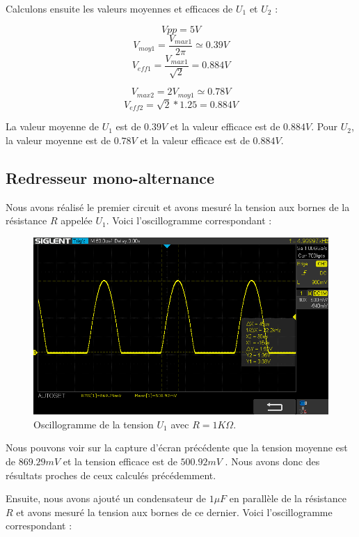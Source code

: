 \newpage
Calculons ensuite les valeurs moyennes et efficaces de $U_1$ et $U_2$ :

\[V{pp}=5V\]
\[V_{moy1}=\frac{V_{max1}}{2\pi} \simeq 0.39V\]
\[V_{eff1}=\frac{V_{max1}}{\sqrt{2}}= 0.884V\]

\[V_{max2}=2V_{moy1}\simeq0.78V\]
\[V_{eff2}=\sqrt{2}*1.25=0.884V\]


La valeur moyenne de $U_1$ est de $0.39V$ et la valeur efficace est de $0.884V$. Pour $U_2$, la valeur moyenne est de $0.78V$ et la valeur efficace est de $0.884V$.

\newpage
\subsection{Redresseur mono-alternance}

Nous avons réalisé le premier circuit et avons mesuré la tension aux bornes de la résistance $R$ appelée $U_1$. Voici l'oscillogramme correspondant :

\begin{figure}[H]
    \begin{center}
    \includegraphics[scale=0.5]{images/Oscillo/SDS00006.png}
    \caption{Oscillogramme de la tension $U_1$ avec $R=1K\Omega$.}
    \end{center}
\end{figure}
Nous pouvons voir sur la capture d'écran précédente que la tension moyenne est de $869.29mV$ et la tension efficace est de $500.92mV$ . Nous avons donc des résultats proches de ceux calculés précédemment.

Ensuite, nous avons ajouté un condensateur de $1\mu F$ en parallèle de la résistance $R$ et avons mesuré la tension aux bornes de ce dernier. Voici l'oscillogramme correspondant :

